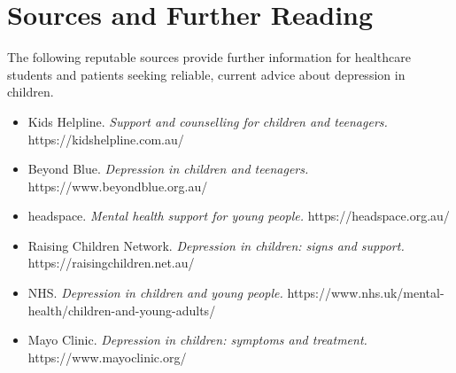 \section*{Sources and Further Reading}
The following reputable sources provide further information for healthcare students and patients seeking reliable, current advice about depression in children.

\begin{itemize}
    \item Kids Helpline. \textit{Support and counselling for children and teenagers.} https://kidshelpline.com.au/
    \item Beyond Blue. \textit{Depression in children and teenagers.} https://www.beyondblue.org.au/
    \item headspace. \textit{Mental health support for young people.} https://headspace.org.au/
    \item Raising Children Network. \textit{Depression in children: signs and support.} https://raisingchildren.net.au/
    \item NHS. \textit{Depression in children and young people.} https://www.nhs.uk/mental-health/children-and-young-adults/
    \item Mayo Clinic. \textit{Depression in children: symptoms and treatment.} https://www.mayoclinic.org/
\end{itemize}
